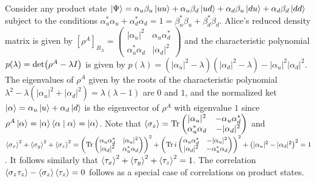 \begin{answer}
	Consider any product state $\ket{\Psi} = \alpha_u \beta_u \ket{u u} + \alpha_u \beta_d \ket{u d} + \alpha_d \beta_u \ket{d u} + \alpha_d \beta_d \ket{d d}$ subject to the conditions $\alpha_u^* \alpha_u + \alpha_d^* \alpha_d = 1 = \beta_u^* \beta_u + \beta_d^* \beta_d$.
	Alice's reduced density matrix is given by $\left[\rho^A\right]_{B_A} = \begin{pmatrix} |\alpha_u|^2 & \alpha_u \alpha_d^* \\ \alpha_u^* \alpha_d & |\alpha_d|^2 \end{pmatrix}$ and the characteristic polynomial $p(\lambda) = \det\!\left(\rho^A - \lambda I\right)$ is given by $p(\lambda) = \left(|\alpha_u|^2 - \lambda\right)\left(|\alpha_d|^2 - \lambda\right) - |\alpha_u|^2 |\alpha_d|^2$.
	The eigenvalues of $\rho^A$ given by the roots of the characteristic polynomial $\lambda^2 - \lambda \left(|\alpha_u|^2 + |\alpha_d|^2\right) = \lambda(\lambda - 1)$ are $0$ and $1$, and the normalized ket $\ket{\alpha} = \alpha_u \ket{u} + \alpha_d \ket{d}$ is the eigenvector of $\rho^A$ with eigenvalue $1$ since $\rho^A \ket{\alpha} = \ket{\alpha} \braket{\alpha \mid \alpha} = \ket{\alpha}$.
	Note that $\braket{\sigma_z} = \operatorname{Tr} \begin{pmatrix} |\alpha_u|^2 & - \alpha_u \alpha_d^* \\ \alpha_u^* \alpha_d & - |\alpha_d|^2\end{pmatrix}$ and $\braket{\sigma_x}^2 + \braket{\sigma_y}^2 + \braket{\sigma_z}^2 = \left(\operatorname{Tr} \begin{pmatrix} \alpha_u \alpha_d^* & |\alpha_u|^2 \\ |\alpha_d|^2 & \alpha_u^* \alpha_d \end{pmatrix}\right)^2 + \left(\operatorname{Tr} i\begin{pmatrix} \alpha_u \alpha_d^* & - |\alpha_u|^2 \\ |\alpha_d|^2 & - \alpha_u^* \alpha_d \end{pmatrix}\right)^2 + \left(|\alpha_u|^2 - |\alpha_d|^2\right)^2 = 1$.
	It follows similarly that $\braket{\tau_x}^2 + \braket{\tau_y}^2 + \braket{\tau_z}^2 = 1$.
	The correlation $\braket{\sigma_z \tau_z} - \braket{\sigma_z} \braket{\tau_z} = 0$ follows as a special case of correlations on product states.


\end{answer}

